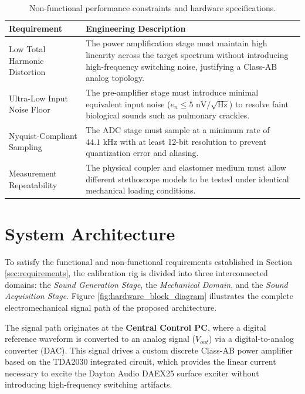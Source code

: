 \begin{table}[H]
    \centering
    \caption{Non-functional performance constraints and hardware specifications.}
    \label{tab:non_functional_req}
    \renewcommand{\arraystretch}{1.3}
    \begin{tabular}{|p{4.8cm}|p{9.2cm}|}
        \hline
        \textbf{Requirement} & \textbf{Engineering Description} \\
        \hline
        Low Total Harmonic Distortion & The power amplification stage must maintain high linearity across the target spectrum without introducing high-frequency switching noise, justifying a Class-AB analog topology. \\
        \hline
        Ultra-Low Input Noise Floor & The pre-amplifier stage must introduce minimal equivalent input noise ($e_n \le 5\text{ nV}/\sqrt{\text{Hz}}$) to resolve faint biological sounds such as pulmonary crackles. \\
        \hline
        Nyquist-Compliant Sampling & The ADC stage must sample at a minimum rate of $44.1\text{ kHz}$ with at least 12-bit resolution to prevent quantization error and aliasing. \\
        \hline
        Measurement Repeatability & The physical coupler and elastomer medium must allow different stethoscope models to be tested under identical mechanical loading conditions. \\
        \hline
    \end{tabular}
\end{table}

\section{System Architecture}
\label{sec:architecture}

To satisfy the functional and non-functional requirements established in Section \ref{sec:requirements}, the calibration rig is divided into three interconnected domains: the \textit{Sound Generation Stage}, the \textit{Mechanical Domain}, and the \textit{Sound Acquisition Stage}. Figure \ref{fig:hardware_block_diagram} illustrates the complete electromechanical signal path of the proposed architecture.

The signal path originates at the \textbf{Central Control PC}, where a digital reference waveform is converted to an analog signal ($V_{out}$) via a digital-to-analog converter (DAC). This signal drives a custom discrete Class-AB power amplifier based on the TDA2030 integrated circuit, which provides the linear current necessary to excite the Dayton Audio DAEX25 surface exciter without introducing high-frequency switching artifacts.

